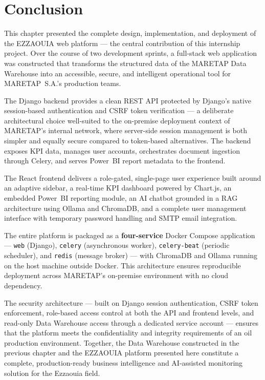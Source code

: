 \section{Conclusion}
\begin{sloppypar}

This chapter presented the complete design, implementation, and deployment of the
EZZAOUIA web platform --- the central contribution of this internship project.
Over the course of two development sprints, a full-stack web application was
constructed that transforms the structured data of the MARETAP Data Warehouse
into an accessible, secure, and intelligent operational tool for
MARETAP~S.A.'s production teams.

The Django backend provides a clean REST API protected by Django's native
session-based authentication and CSRF token verification --- a deliberate
architectural choice well-suited to the on-premise deployment context of
MARETAP's internal network, where server-side session management is both simpler
and equally secure compared to token-based alternatives. The backend exposes KPI
data, manages user accounts, orchestrates document ingestion through Celery, and
serves Power~BI report metadata to the frontend.

The React frontend delivers a role-gated, single-page user experience built
around an adaptive sidebar, a real-time KPI dashboard powered by Chart.js, an
embedded Power~BI reporting module, an AI chatbot grounded in a RAG architecture
using Ollama and ChromaDB, and a complete user management interface with
temporary password handling and SMTP email integration.

The entire platform is packaged as a \textbf{four-service} Docker Compose
application --- \texttt{web} (Django), \texttt{celery} (asynchronous worker),
\texttt{celery-beat} (periodic scheduler), and \texttt{redis} (message broker)
--- with ChromaDB and Ollama running on the host machine outside Docker. This
architecture ensures reproducible deployment across MARETAP's on-premise
environment with no cloud dependency.

The security architecture --- built on Django session authentication, CSRF token
enforcement, role-based access control at both the API and frontend levels, and
read-only Data Warehouse access through a dedicated service account --- ensures
that the platform meets the confidentiality and integrity requirements of an oil
production environment. Together, the Data Warehouse constructed in the previous
chapter and the EZZAOUIA platform presented here constitute a complete,
production-ready business intelligence and AI-assisted monitoring solution for
the Ezzaouia field.

\end{sloppypar}
